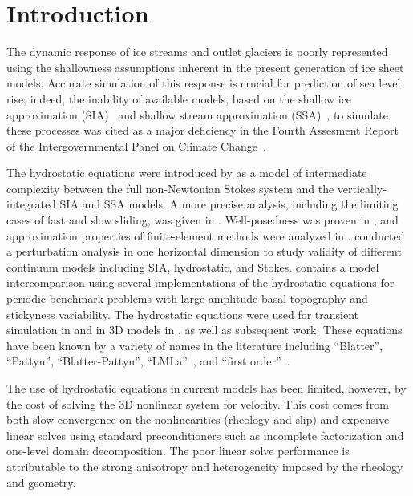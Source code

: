 \section{Introduction}
The dynamic response of ice streams and outlet glaciers is poorly represented using the shallowness
assumptions inherent in the present generation of ice sheet models.  Accurate simulation of this
response is crucial for prediction of sea level rise; indeed, the inability of available models, based on
the shallow ice approximation (SIA)~\citep{hutter1983tgm} and shallow stream approximation
(SSA)~\citep{morland1987unconfined,weis1999theory}, to simulate these processes was cited as a major
deficiency in the Fourth Assesment Report of the Intergovernmental Panel on Climate Change~\citep{ipcc2007ar4-syr}.

The hydrostatic equations were introduced by \citet{blatter1995vas} as a model of intermediate complexity between the full non-Newtonian Stokes system and the vertically-integrated SIA and SSA models.
A more precise analysis, including the limiting cases of fast and slow sliding, was given in \citet{schoof2010thin}.
Well-posedness was proven in \citet{colinge1999strongly}, and approximation properties of finite-element methods were analyzed in \citet{glowinski2003approximation,chow2004finite}.
\citet{hindmarsh2004numerical} conducted a perturbation analysis in one horizontal dimension to study validity of different continuum models including SIA, hydrostatic, and Stokes.
\citet{pattyn2008beh} contains a model intercomparison using several implementations of the hydrostatic equations for periodic benchmark problems with large amplitude basal topography and stickyness variability.
The hydrostatic equations were used for transient simulation in \citet{pattyn2002tgr} and in 3D models in \citet{pattyn2003ntd}, as well as subsequent work.
These equations have been known by a variety of names in the literature including ``Blatter'', ``Pattyn'', ``Blatter-Pattyn'', ``LMLa''~\citep{hindmarsh2004numerical}, and ``first order''~\citep{greve2009dynamics}.

The use of hydrostatic equations in current models has been limited, however, by the cost of solving the 3D nonlinear system for velocity.  This cost comes from both slow convergence on the
nonlinearities (rheology and slip) and expensive linear solves using standard preconditioners such
as incomplete factorization and one-level domain decomposition.  The poor linear solve performance is
attributable to the strong anisotropy and heterogeneity imposed by the rheology and geometry.

